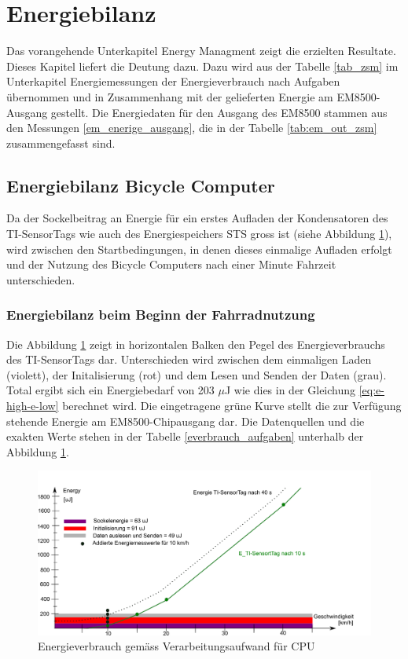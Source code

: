 \section{Energiebilanz}
\label{energiBilanz}
Das vorangehende Unterkapitel Energy Managment zeigt die erzielten Resultate. Dieses Kapitel liefert die Deutung dazu. Dazu wird aus der Tabelle \ref{tab_zsm} im Unterkapitel Energiemessungen der Energieverbrauch nach Aufgaben übernommen und in Zusammenhang mit der gelieferten Energie am EM8500-Ausgang gestellt. Die Energiedaten für den Ausgang des EM8500 stammen aus den Messungen \ref{em_enerige_ausgang}, die in der Tabelle \ref{tab:em_out_zsm} zusammengefasst sind.

\subsection{Energiebilanz Bicycle Computer}

Da der Sockelbeitrag an Energie für ein erstes Aufladen der Kondensatoren des TI-SensorTags wie auch des Energiespeichers STS gross ist (siehe  Abbildung \ref{r_bild_e_zusammenfassung}), wird zwischen den Startbedingungen, in denen dieses einmalige Aufladen erfolgt und der Nutzung des Bicycle Computers nach einer Minute Fahrzeit unterschieden.


\subsubsection{Energiebilanz beim Beginn der Fahrradnutzung}

Die Abbildung \ref{r_bild_e_zusammenfassung} zeigt in horizontalen Balken den Pegel des Energieverbrauchs des TI-SensorTags dar. Unterschieden wird zwischen dem einmaligen Laden (violett), der Initalisierung (rot) und dem Lesen und Senden der Daten (grau). Total ergibt sich ein Energiebedarf von 203 $\mu$J wie dies in der Gleichung \ref{eq:e-high-e-low} berechnet wird. Die eingetragene grüne Kurve stellt die zur Verfügung stehende Energie am EM8500-Chipausgang dar. Die Datenquellen und die exakten Werte stehen in der Tabelle \ref{everbrauch_aufgaben} unterhalb der Abbildung \ref{r_bild_e_zusammenfassung}.

\begin{figure}[ht]
     \includegraphics[width=1\textwidth]{4Resultate/imag/EnergyVerbrauchZusammenfassung.png}
     \caption{Energieverbrauch gem\"{a}ss Verarbeitungsaufwand für CPU}
     \label{r_bild_e_zusammenfassung}
\end{figure}

